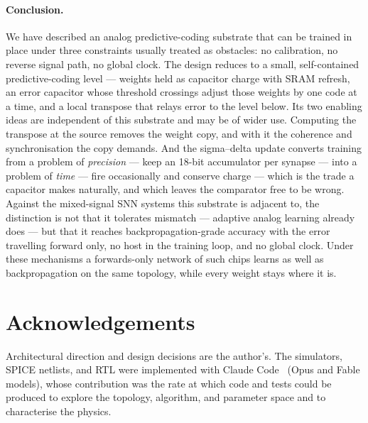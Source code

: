 \documentclass[11pt]{article}
\begin{document}
\paragraph{Conclusion.} We have described an analog predictive-coding substrate that can be trained in
place under three constraints usually treated as obstacles: no calibration, no reverse signal path, no
global clock. The design reduces to a small, self-contained predictive-coding level --- weights held
as capacitor charge with SRAM refresh, an error capacitor whose threshold crossings adjust those
weights by one code at a time, and a local transpose that relays error to the level below. Its two
enabling ideas are independent of this substrate and may be of wider use. Computing the transpose at
the source removes the weight copy, and with it the coherence and synchronisation the copy demands.
And the sigma--delta update converts training from a problem of \emph{precision} --- keep an 18-bit
accumulator per synapse --- into a problem of \emph{time} --- fire occasionally and conserve charge ---
which is the trade a capacitor makes naturally, and which leaves the comparator free to be wrong.
Against the mixed-signal SNN systems this substrate is adjacent to, the distinction is not that it
tolerates mismatch --- adaptive analog learning already does --- but that it reaches
backpropagation-grade accuracy with the error travelling forward only, no host in the training loop,
and no global clock. Under these mechanisms a forwards-only network of such chips learns as well as
backpropagation on the same topology, while every weight stays where it is.

\section*{Acknowledgements}
Architectural direction and design decisions are the author's. The simulators, SPICE netlists, and RTL
were implemented with Claude Code~\cite{anthropic2025claudecode} (Opus and Fable models), whose
contribution was the rate at which code and tests could be produced to explore the topology,
algorithm, and parameter space and to characterise the physics.



\end{document}
